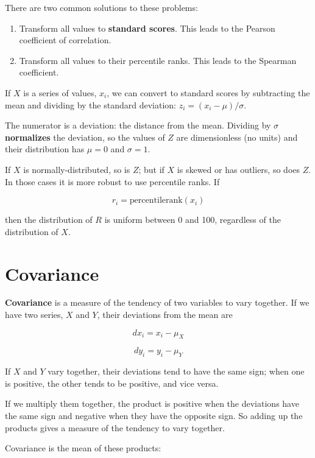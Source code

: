 \documentclass[12pt]{book}
\begin{document}
There are two common solutions to these problems:

\begin{enumerate}

\item Transform all values to {\bf standard scores}.  This leads to
the Pearson coefficient of correlation.

\item Transform all values to their percentile ranks.  This
leads to the Spearman coefficient.

\end{enumerate}

If $X$ is a series of values, $x_i$, we can convert to standard
scores by subtracting the mean and dividing by the standard deviation:
$z_i = (x_i - \mu) / \sigma$.

The numerator is a deviation: the distance from the mean.  Dividing by
$\sigma$ {\bf normalizes} the deviation, so the values of $Z$ are
dimensionless (no units) and their distribution has $\mu=0$ and
$\sigma=1$.

If $X$ is normally-distributed, so is $Z$; but if $X$ is skewed
or has outliers, so does $Z$.  In those cases it is more robust to
use percentile ranks.  If

\[ r_i = \mathrm{percentile rank} (x_i) \]

then the distribution of $R$ is uniform between 0 and 100, regardless of
the distribution of $X$.


\section{Covariance}

{\bf Covariance} is a measure of the tendency of two variables
to vary together.  If we have two series, $X$ and $Y$, their
deviations from the mean are

\[ dx_i = x_i - \mu_X \]

\[ dy_i = y_i - \mu_Y \]

If $X$ and $Y$ vary together, their deviations tend to have the
same sign; when one is positive, the other tends to be
positive, and vice versa.  

If we multiply them together, the product is positive when the
deviations have the same sign and negative when they have the opposite
sign.  So adding up the products gives a measure of the tendency to
vary together.

Covariance is the mean of these products:
\end{document}
